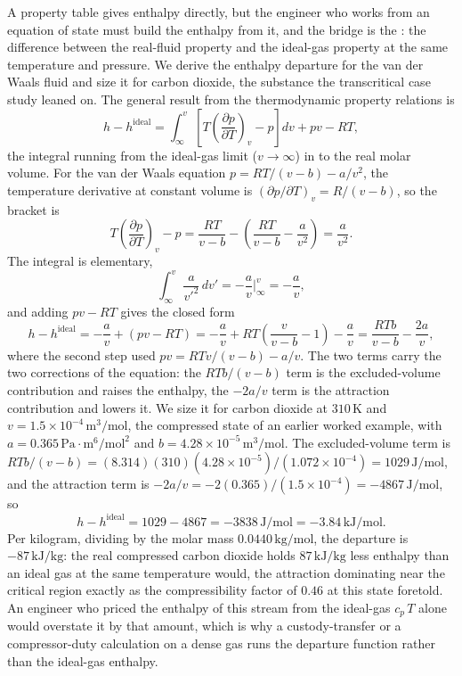 A property table gives enthalpy directly, but the engineer who works from an
equation of state must build the enthalpy from it, and the bridge is the
: the difference between the real-fluid property
and the ideal-gas property at the same temperature and pressure. We derive
the enthalpy departure for the van der Waals fluid and size it for carbon
dioxide, the substance the transcritical case study leaned on. The general
result from the thermodynamic property relations is
\[
h - h^{\text{ideal}} = \int_{\infty}^{v}\left[T\left(\frac{\partial
p}{\partial T}\right)_v - p\right]dv + pv - RT,
\]
the integral running from the ideal-gas limit ($v\to\infty$) in to the real
molar volume. For the van der Waals equation $p = RT/(v-b) - a/v^2$, the
temperature derivative at constant volume is $(\partial p/\partial T)_v =
R/(v-b)$, so the bracket is
\[
T\left(\frac{\partial p}{\partial T}\right)_v - p = \frac{RT}{v-b} -
\left(\frac{RT}{v-b} - \frac{a}{v^2}\right) = \frac{a}{v^2}.
\]
The integral is elementary,
\[
\int_{\infty}^{v}\frac{a}{v'^2}\,dv' = -\frac{a}{v}\bigg|_{\infty}^{v} =
-\frac{a}{v},
\]
and adding $pv - RT$ gives the closed form
\[
h - h^{\text{ideal}} = -\frac{a}{v} + (pv - RT) = -\frac{a}{v} + RT\!\left(
\frac{v}{v-b} - 1\right) - \frac{a}{v} = \frac{RTb}{v-b} - \frac{2a}{v},
\]
where the second step used $pv = RTv/(v-b) - a/v$. The two terms carry the
two corrections of the equation: the $RTb/(v-b)$ term is the
excluded-volume contribution and raises the enthalpy, the $-2a/v$ term is
the attraction contribution and lowers it. We size it for carbon dioxide at
$310\,\si{\kelvin}$ and $v = 1.5\times 10^{-4}\,\text{m}^3/\text{mol}$, the
compressed state of an earlier worked example, with $a = 0.365\,\text{Pa}
\cdot\text{m}^6/\text{mol}^2$ and $b = 4.28\times 10^{-5}\,\text{m}^3/
\text{mol}$. The excluded-volume term is $RTb/(v-b) = (8.314)(310)(4.28
\times 10^{-5})/(1.072\times 10^{-4}) = 1029\,\text{J}/\text{mol}$, and the
attraction term is $-2a/v = -2(0.365)/(1.5\times 10^{-4}) = -4867\,\text{J}/
\text{mol}$, so
\[
h - h^{\text{ideal}} = 1029 - 4867 = -3838\,\text{J}/\text{mol} =
-3.84\,\text{kJ}/\text{mol}.
\]
Per kilogram, dividing by the molar mass $0.0440\,\text{kg}/\text{mol}$, the
departure is $-87\,\text{kJ}/\text{kg}$: the real compressed carbon dioxide
holds $87\,\text{kJ}/\text{kg}$ less enthalpy than an ideal gas at the same
temperature would, the attraction dominating near the critical region
exactly as the compressibility factor of $0.46$ at this state foretold. An
engineer who priced the enthalpy of this stream from the ideal-gas $c_p\,T$
alone would overstate it by that amount, which is why a custody-transfer or
a compressor-duty calculation on a dense gas runs the departure function
rather than the ideal-gas enthalpy.

